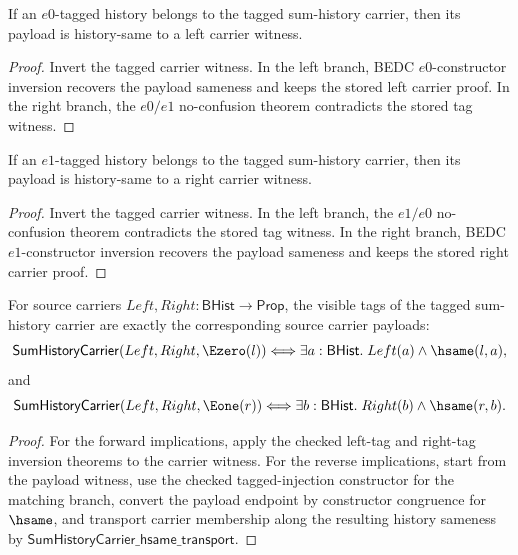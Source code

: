\begin{theorem}
\label{thm:sum-history-carrier-left-tag-inversion}
If an \(e0\)-tagged history belongs to the tagged sum-history carrier, then
its payload is history-same to a left carrier witness.
\end{theorem}
\begin{proof}
Invert the tagged carrier witness. In the left branch, BEDC \(e0\)-constructor
inversion recovers the payload sameness and keeps the stored left carrier
proof. In the right branch, the \(e0/e1\) no-confusion theorem contradicts the
stored tag witness.
\end{proof}

\begin{theorem}
\label{thm:sum-history-carrier-e1-inversion}
If an $e1$-tagged history belongs to the tagged sum-history carrier, then
its payload is history-same to a right carrier witness.
\end{theorem}
\begin{proof}
Invert the tagged carrier witness. In the left branch, the $e1/e0$
no-confusion theorem contradicts the stored tag witness. In the right branch,
BEDC $e1$-constructor inversion recovers the payload sameness and keeps the
stored right carrier proof.
\end{proof}

\begin{theorem}
\label{thm:sum-history-carrier-visible-tag-exactness}
For source carriers $Left,Right:\mathsf{BHist}\to\mathsf{Prop}$, the visible
tags of the tagged sum-history carrier are exactly the corresponding source
carrier payloads:
$$
\mathsf{SumHistoryCarrier}(Left,Right,\Ezero(l))
\Longleftrightarrow
\exists a:\mathsf{BHist}.\; Left(a)\land \hsame(l,a),
$$
and
$$
\mathsf{SumHistoryCarrier}(Left,Right,\Eone(r))
\Longleftrightarrow
\exists b:\mathsf{BHist}.\; Right(b)\land \hsame(r,b).
$$
\end{theorem}
\begin{proof}
For the forward implications, apply the checked left-tag and right-tag inversion
theorems to the carrier witness. For the reverse implications, start from the
payload witness, use the checked tagged-injection constructor for the matching
branch, convert the payload endpoint by constructor congruence for $\hsame$,
and transport carrier membership along the resulting history sameness by
$\mathsf{SumHistoryCarrier\_hsame\_transport}$.
\end{proof}

